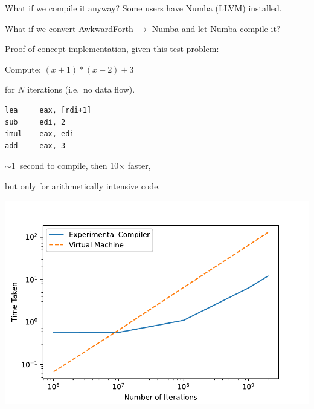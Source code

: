 \documentclass[aspectratio=169]{beamer}
\begin{document}
\begin{frame}[fragile]{What if we compile it anyway?}
\vspace{0.5 cm}
Some users have Numba (LLVM) installed.

\vspace{0.25 cm}
What if we convert AwkwardForth $\to$ Numba and let Numba compile it?

\vspace{0.5 cm}
Proof-of-concept implementation, given this test problem:

\vspace{0.25 cm}
Compute: $(x + 1) * (x - 2) + 3$

for $N$ iterations (i.e.\ no data flow).

\vspace{0.25 cm}

\vspace{0.25 cm}
\scriptsize
\begin{verbatim}
lea     eax, [rdi+1]
sub     edi, 2
imul    eax, edi
add     eax, 3
\end{verbatim}

\normalsize
\vspace{0.5 cm}
$\sim$1~second to compile, then 10$\times$ faster,

but only for arithmetically intensive code.

\vspace{-5 cm}
\hfill \includegraphics[width=0.6\linewidth]{PLOTS/new_compiler.pdf} \mbox{\hspace{-1 cm}}

\end{frame}
\end{document}
